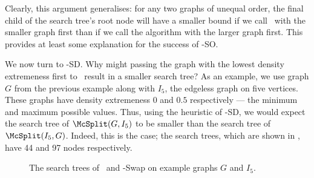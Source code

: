 Clearly, this argument generalises: for any two graphs of unequal order,
the final child of the search tree's root node will have a smaller bound
if we call \McSplit\ with the smaller graph first than if we call the algorithm
with the larger graph first.  This provides at least some explanation for the success of
\McSplit-SO.

We now turn to \McSplit-SD.  Why might passing the graph with the lowest density
extremeness first to \McSplit\ result in a smaller search tree?  As an example, we
use graph $G$ from the previous example along with $I_5$, the edgeless graph on five vertices.
These graphs have density extremeness $0$ and $0.5$ respectively --- the
minimum and maximum possible values.  Thus, using the heuristic of \McSplit-SD,
we would expect the search tree of $\McSplit(G, I_5)$ to be smaller than the search
tree of $\McSplit(I_5, G)$.  Indeed, this is the case; the search trees,
which are shown in , have 44
and 97 nodes respectively.

\begin{figure}[htb]
    \centering
    \caption{The search trees of \McSplit\ and \McSplit-Swap on example graphs $G$ and $I_5$.}
        \label{figure:search-trees-gi-with-swapping}
\end{figure}


